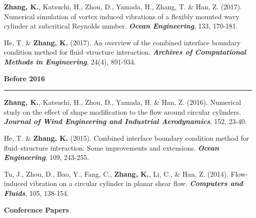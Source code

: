 \documentclass[10pt]{article}
\begin{document}
{\begin{etaremune}
  \item \textbf{Zhang, K.}, Katsuchi, H., Zhou, D., Yamada, H., Zhang, T. \& Han, Z. (2017). Numerical simulation of vortex induced vibrations of a flexibly mounted wavy cylinder at subcritical Reynolds number. \textit{\textbf{Ocean Engineering}}, 133, 170-181.
  
  \item He, T. \& \textbf{Zhang, K.} (2017). An overview of the combined interface boundary condition method for fluid–structure interaction. \textit{\textbf{Archives of Computational Methods in Engineering}}, 24(4), 891-934.
  
 \item [] {\bf \color{Blue} Before 2016 \rule{13.6cm}{0.2mm}}   

  \item \textbf{Zhang, K.}, Katsuchi, H., Zhou, D., Yamada, H. \& Han, Z. (2016). Numerical study on the effect of shape modification to the flow around circular cylinders. \textit{\textbf{Journal of Wind Engineering and Industrial Aerodynamics}}, 152, 23-40.  

  \item He, T. \& \textbf{Zhang, K.} (2015). Combined interface boundary condition method for fluid–structure interaction: Some improvements and extensions. \textit{\textbf{Ocean Engineering}}, 109, 243-255.
  
  \item Tu, J., Zhou, D., Bao, Y., Fang, C., \textbf{Zhang, K.}, Li, C., \& Han, Z. (2014). Flow-induced vibration on a circular cylinder in planar shear flow. \textit{\textbf{Computers and Fluids}}, 105, 138-154.

\end{etaremune}
}

\vspace{+0.1in}
{\bf \color{Blue}Conference Papers}
\end{document}
